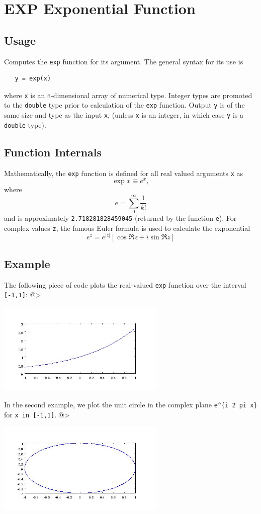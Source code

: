 \section{EXP Exponential Function}

\subsection{Usage}

Computes the \verb|exp| function for its argument.  The general
syntax for its use is
\begin{verbatim}
   y = exp(x)
\end{verbatim}
where \verb|x| is an \verb|n|-dimensional array of numerical type.
Integer types are promoted to the \verb|double| type prior to
calculation of the \verb|exp| function.  Output \verb|y| is of the
same size and type as the input \verb|x|, (unless \verb|x| is an
integer, in which case \verb|y| is a \verb|double| type).
\subsection{Function Internals}

Mathematically, the \verb|exp| function is defined for all real
valued arguments \verb|x| as
\[
  \exp x \equiv e^{x},
\]
where
\[
  e = \sum_{0}^{\infty} \frac{1}{k!}
\]
and is approximately \verb|2.718281828459045| (returned by the function 
\verb|e|).  For complex values
\verb|z|, the famous Euler formula is used to calculate the 
exponential
\[
  e^{z} = e^{|z|} \left[ \cos \Re z + i \sin \Re z \right]
\]
\subsection{Example}

The following piece of code plots the real-valued \verb|exp|
function over the interval \verb|[-1,1]|:
@>


\centerline{\includegraphics[width=8cm]{expplot1}}

In the second example, we plot the unit circle in the 
complex plane \verb|e^{i 2 pi x}| for \verb|x in [-1,1]|.
@>


\centerline{\includegraphics[width=8cm]{expplot2}}

